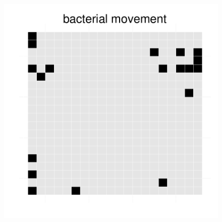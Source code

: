 \begin{figure}[h]
{\begin{minipage}[t]{0.3\textwidth}
  \end{minipage}
  \begin{minipage}[t]{0.3\textwidth}
    \includegraphics[width=\textwidth]{../results/ecoli_20x20_aerob_seed55_bac50.pdf}
  \end{minipage}
  }
\end{figure}
